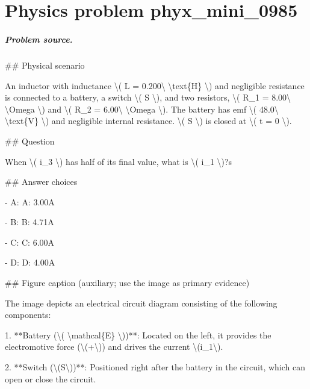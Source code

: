 
\chapter{Physics problem phyx\_mini\_0985}
\label{ch:PhyXMiniProblems_problem_phyx_mini_0985}

\paragraph{Problem source.}
\#\# Physical scenario

An inductor with inductance \textbackslash{}( L = 0.200\textbackslash{} \textbackslash{}text\{H\} \textbackslash{}) and negligible resistance is connected to a battery, a switch \textbackslash{}( S \textbackslash{}), and two resistors, \textbackslash{}( R\_1 = 8.00\textbackslash{} \textbackslash{}Omega \textbackslash{}) and \textbackslash{}( R\_2 = 6.00\textbackslash{} \textbackslash{}Omega \textbackslash{}). The battery has emf \textbackslash{}( 48.0\textbackslash{} \textbackslash{}text\{V\} \textbackslash{}) and negligible internal resistance. \textbackslash{}( S \textbackslash{}) is closed at \textbackslash{}( t = 0 \textbackslash{}).

\#\# Question

When \textbackslash{}( i\_3 \textbackslash{}) has half of its final value, what is \textbackslash{}( i\_1 \textbackslash{})?s

\#\# Answer choices

- A: A: 3.00A

- B: B: 4.71A

- C: C: 6.00A

- D: D: 4.00A

\#\# Figure caption (auxiliary; use the image as primary evidence)

The image depicts an electrical circuit diagram consisting of the following components:

1. **Battery (\textbackslash{}( \textbackslash{}mathcal\{E\} \textbackslash{}))**: Located on the left, it provides the electromotive force (\textbackslash{}(+\textbackslash{})) and drives the current \textbackslash{}(i\_1\textbackslash{}).

2. **Switch (\textbackslash{}(S\textbackslash{}))**: Positioned right after the battery in the circuit, which can open or close the circuit.


